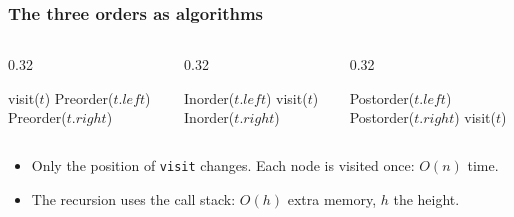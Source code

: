 \documentclass[aspectratio=169,10pt,compress]{beamer}
\begin{document}
\begin{frame}[t,fragile] \frametitle{The three orders as algorithms}
  \begin{columns}[T]
    \begin{column}{0.32\textwidth}
      \SetAlFnt{\small}


\begin{algorithm}[H]
  \caption{Preorder($t$)}
  visit($t$)\;
  Preorder($t.left$)\;
  Preorder($t.right$)\;
\end{algorithm}

    \end{column}
    \begin{column}{0.32\textwidth}
      \SetAlFnt{\small}


\begin{algorithm}[H]
  \caption{Inorder($t$)}
  Inorder($t.left$)\;
  visit($t$)\;
  Inorder($t.right$)\;
\end{algorithm}

    \end{column}
    \begin{column}{0.32\textwidth}
      \SetAlFnt{\small}


\begin{algorithm}[H]
  \caption{Postorder($t$)}
  Postorder($t.left$)\;
  Postorder($t.right$)\;
  visit($t$)\;
\end{algorithm}

    \end{column}
  \end{columns}
  \begin{itemize}\small
    \item Only the position of \texttt{visit} changes. Each node is visited once: $O(n)$ time.
    \item The recursion uses the call stack: $O(h)$ extra memory, $h$ the height.
  \end{itemize}
\end{frame}
\end{document}
